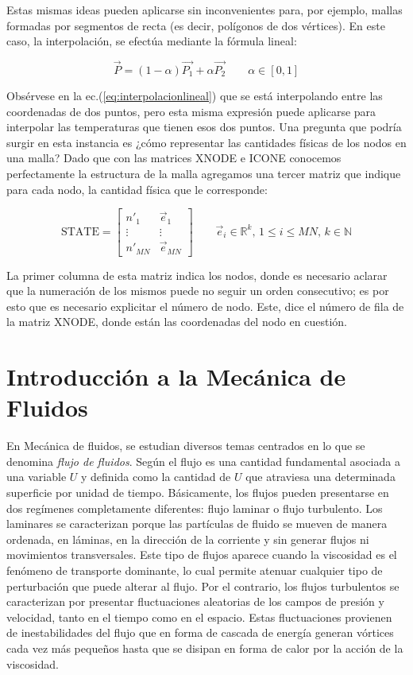 Estas mismas ideas pueden aplicarse sin inconvenientes para, por ejemplo, mallas formadas por segmentos de recta (es decir, polígonos de dos vértices). En este caso, la interpolación, se efectúa mediante la fórmula lineal:

\begin{equation}
  \label{eq:interpolacionlineal}
  \vec{P} = (1-\alpha)\vec{P_1} + \alpha\vec{P_2} \qquad \alpha\in[0,1]
\end{equation}

Obsérvese en la ec.(\ref{eq:interpolacionlineal}) que se está interpolando entre las coordenadas de dos puntos, pero esta misma expresión puede aplicarse para interpolar las temperaturas que tienen esos dos puntos.
Una pregunta que podría surgir en esta instancia es ¿cómo representar las cantidades físicas de los nodos en una malla? Dado que con las matrices XNODE e ICONE conocemos perfectamente la estructura de la malla agregamos una tercer matriz que indique para cada nodo, la cantidad física que le corresponde:

\begin{equation}
  \label{eq:estados}
  \text{STATE}=
  \begin{bmatrix}
    n'_{1} & \vec{e}_{1} \\
    \vdots & \vdots \\
    n'_{MN} & \vec{e}_{MN}
  \end{bmatrix}
  \qquad \vec{e}_i\in\mathbb{R}^k,\,1\leq i\leq MN,\,k\in \mathbb{N}
\end{equation}

La primer columna de esta matriz indica los nodos, donde es necesario aclarar que la numeración de los mismos puede no seguir un orden consecutivo; es por esto que es necesario explicitar el número de nodo. Este, dice el número de fila de la matriz XNODE, donde están las coordenadas del nodo en cuestión.

\section{Introducción a la Mecánica de Fluidos}

	En Mecánica de fluidos, se estudian diversos temas centrados en lo que se denomina \emph{flujo de fluidos}. Según \cite{Hirsch} el flujo es una cantidad fundamental asociada a una variable $U$ y definida como la cantidad de $U$ que atraviesa una determinada superficie por unidad de tiempo. Básicamente, los flujos pueden presentarse en dos regímenes completamente diferentes: flujo laminar o flujo turbulento. Los laminares se caracterizan porque las partículas de fluido se mueven de manera ordenada, en láminas, en la dirección de la corriente y sin generar flujos ni movimientos transversales. Este tipo de flujos aparece cuando la viscosidad es el fenómeno de transporte dominante, lo cual permite atenuar cualquier tipo de perturbación que puede alterar al flujo. Por el contrario, los flujos turbulentos se caracterizan por presentar fluctuaciones aleatorias de los campos de presión y velocidad, tanto en el tiempo como en el espacio. Estas fluctuaciones provienen de inestabilidades del flujo que en forma de cascada de energía generan vórtices cada vez más pequeños hasta que se disipan en forma de calor por la acción de la viscosidad.

